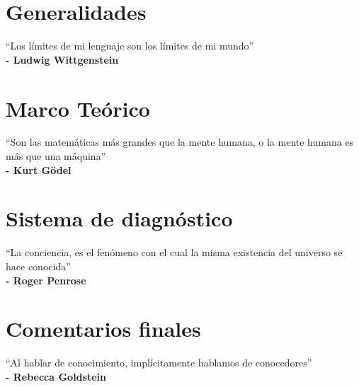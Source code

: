 \documentclass[12pt,oneside,letterpaper]{book}
\begin{document}
\chapter{Generalidades}
\begin{minipage}[t]{0.6\textwidth}
    \begin{flushleft}
        \large
        ``Los límites de mi lenguaje son los límites de mi mundo'' \\
        \textbf{- Ludwig Wittgenstein}
    \end{flushleft}
\end{minipage}


\chapter{Marco Teórico}
\begin{minipage}[t]{0.6\textwidth}
    \begin{flushleft}
        \large
        ``Son las matemáticas más grandes que la mente humana, o la mente humana es más que una máquina'' \\
        \textbf{- Kurt Gödel}
    \end{flushleft}
\end{minipage}



\chapter{Sistema de diagnóstico}
\begin{minipage}[t]{0.6\textwidth}
    \begin{flushleft}
        \large
        ``La conciencia, es el fenómeno con el cual la misma existencia del universo se hace conocida'' \\
        \textbf{- Roger Penrose}
    \end{flushleft}
\end{minipage}




\chapter{Comentarios finales}
\begin{minipage}[t]{0.6\textwidth}
    \begin{flushleft}
    \large
    ``Al hablar de conocimiento, implícitamente hablamos de conocedores''\\
    \textbf{- Rebecca Goldstein}
    \end{flushleft}
\end{minipage}

\appendix
\end{document}

